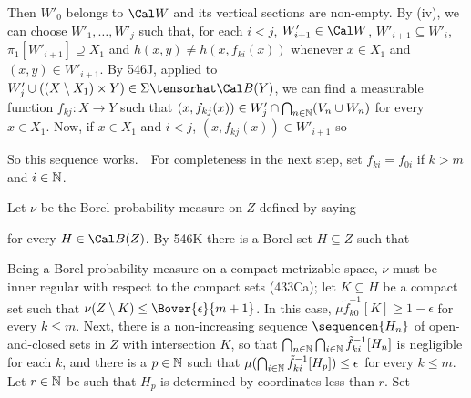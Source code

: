 {

\noindent Then $W'_0$ belongs to $\Cal W$ and its vertical sections are non-empty.
By (iv), we can choose $W'_1,\ldots,W'_j$ such that, for each $i<j$,
$W'_{i+1}\in\Cal W$, $W'_{i+1}\subseteq W'_i$,
$\pi_1[W'_{i+1}]\supseteq X_1$ and
$h(x,y)\ne h(x,f_{ki}(x))$ whenever $x\in X_1$ and $(x,y)\in W'_{i+1}$.
By 546J, applied to
$W'_j\cup((X\setminus X_1)\times Y)\in\Sigma\tensorhat\Cal B(Y)$,
we can find a measurable function $f_{kj}:X\to Y$ such that
$(x,f_{kj}(x))\in W'_j\cap\bigcap_{n\in\Bbb N}(V_n\cup W_n)$
for every $x\in X_1$.   Now, if $x\in X_1$ and $i<j$,
$(x,f_{kj}(x))\in W'_{i+1}$ so


\noindent So this sequence works.\ \QeD\
For completeness in the next step,
set $f_{ki}=f_{0i}$ if $k>m$ and $i\in\Bbb N$.


 Let $\nu$ be the Borel probability measure on $Z$
defined by saying


\noindent for every $H\in\Cal B(Z)$.   By 546K there is a Borel set
$H\subseteq Z$ such that


\noindent Being a Borel probability measure on a compact metrizable space,
$\nu$ must be inner
regular with respect to the compact sets (433Ca);
let $K\subseteq H$ be a compact
set such that $\nu(Z\setminus K)\le\Bover{\epsilon}{m+1}$.   In this case,
$\mu\tilde f_{k0}^{-1}[K]\ge 1-\epsilon$ for every $k\le m$.
Next, there is a non-increasing sequence $\sequencen{H_n}$ of open-and-closed sets
in $Z$ with intersection $K$, so that
$\bigcap_{n\in\Bbb N}\bigcap_{i\in\Bbb N}\tilde f_{ki}^{-1}[H_n]$ is negligible for
each $k$, and there is a $p\in\Bbb N$ such that
$\mu(\bigcap_{i\in\Bbb N}\tilde f_{ki}^{-1}[H_p])\le\epsilon$ for every $k\le m$.
Let $r\in\Bbb N$ be such that $H_p$ is determined by coordinates less than $r$.
Set



}
